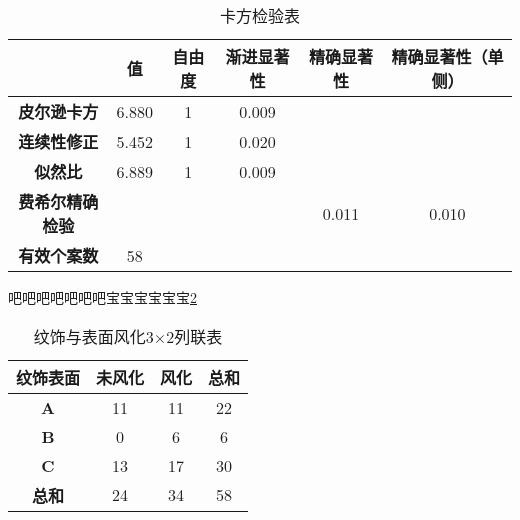\documentclass[withoutpreface,bwprint]{cumcmthesis} %
\begin{document}
\begin{table}[H]
	\caption{卡方检验表}\label{tab:001} \centering
	\centering
	\setlength{\tabcolsep}{1mm}%
	\begin{tabular}{cccccc}
		\toprule[1.5pt]
		&\textbf{值}& \textbf{自由度} &\textbf{渐进显著性}&\textbf{精确显著性} &\textbf{精确显著性（单侧）} \\  %
		\midrule[1pt]
		\textbf{皮尔逊卡方} & 6.880& 1&0.009 & &                    \\
		\textbf{连续性修正} & 5.452& 1&0.020 & &                    \\
		\textbf{似然比} & 6.889 &1 & 0.009 & &                    \\
		\textbf{费希尔精确检验} &  & &  &0.011 &0.010                    \\
		\textbf{有效个案数} & 58 & &  & &                    \\
		\bottomrule[1.5pt]
	\end{tabular}
\end{table}
 


吧吧吧吧吧吧吧宝宝宝宝宝宝\ref{tab:001}
\begin{table}[H]
	\caption{纹饰与表面风化3$\times$2列联表}\label{tab:001} \centering
	\centering
	\setlength{\tabcolsep}{10mm}%
	\begin{tabular}{c|ccc}
		\toprule[1.5pt]
		\textbf{纹饰表面}& \textbf{未风化} &\textbf{风化}&\textbf{总和}  \\  %
		\midrule[1pt]
		\textbf{A} & 11&11&22                    \\
		\textbf{B} & 0&6 &6                      \\
		\textbf{C} & 13 &17 & 30                     \\
		\textbf{总和} & 24 &34 & 58                     \\
		\bottomrule[1.5pt]
	\end{tabular}
\end{table}
 
 
 
\end{document}
